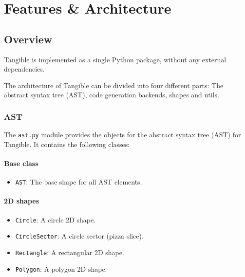 
\chapter{Features {\&} Architecture}

\label{ch:features}


\section{Overview}\label{sec:overview}

Tangible is implemented as a single Python package, without any external
dependencies.

The architecture of Tangible can be divided into four different parts: The
abstract syntax tree (AST), code generation backends, shapes and utils.

\subsection{AST}\label{sec:overview:ast}

The \texttt{ast.py} module provides the objects for the abstract syntax tree
(AST) for Tangible. It contains the following classes:

\subsubsection{Base class}

\begin{itemize}
	\item \texttt{AST}: The base shape for all AST elements.
\end{itemize}

\subsubsection{2D shapes}

\begin{itemize}
	\item \texttt{Circle}: A circle 2D shape.
	\item \texttt{CircleSector}: A circle sector (pizza slice).
	\item \texttt{Rectangle}: A rectangular 2D shape.
	\item \texttt{Polygon}: A polygon 2D shape.
\end{itemize}

